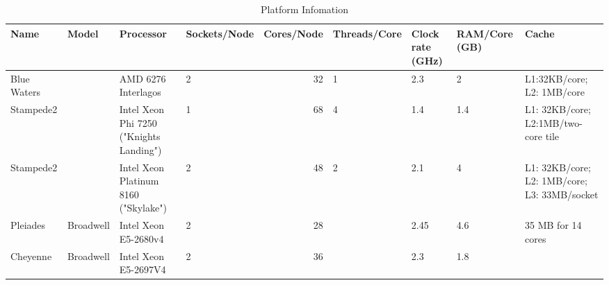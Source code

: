 \usepackage{adjustbox}

\begin{table}[t]
\caption{Platform Infomation}
\begin{adjustbox}{width=1\textwidth}
\begin{tabular}{|l|l|l|l|r|l|l|l|l|}
\centering
\hline
Name        & Model     & Processor  & Sockets/Node & Cores/Node & Threads/Core & Clock rate (GHz) & RAM/Core (GB) & Cache                                        \\
\hline
Blue Waters &           & AMD 6276 Interlagos                     & 2            & 32         & 1            & 2.3              & 2             & L1:32KB/core; L2: 1MB/core                                         \\
Stampede2   &           & Intel Xeon Phi 7250 ("Knights Landing") & 1            & 68         & 4            & 1.4              & 1.4           & L1: 32KB/core; L2:1MB/two-core tile          \\
Stampede2   &           & Intel Xeon Platinum 8160 ("Skylake")    & 2            & 48         & 2            & 2.1              & 4             & L1: 32KB/core; L2: 1MB/core; L3: 33MB/socket \\
Pleiades    & Broadwell & Intel Xeon E5-2680v4                    & 2            & 28         &              & 2.45             & 4.6           & 35 MB for 14 cores                           \\
Cheyenne    & Broadwell & Intel Xeon E5-2697V4                    & 2            & 36         &              & 2.3              & 1.8           &   \\ 
\hline                                 
\end{tabular}
\end{adjustbox}
\label{tab:platform}
\end{table}